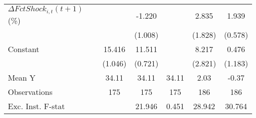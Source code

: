 {\begin{tabular}{l*{5}{c}}
\addlinespace
$ \Delta FctShock_{i,t}(t+1)$ (\%)&                     &      -1.220         &                     &       2.835         &       1.939\sym{***}\\
                    &                     &     (1.008)         &                     &     (1.828)         &     (0.578)         \\
\addlinespace
Constant            &      15.416\sym{***}&      11.511\sym{***}&                     &       8.217\sym{**} &       0.476         \\
                    &     (1.046)         &     (0.721)         &                     &     (2.821)         &     (1.183)         \\
\midrule
Mean Y              &       34.11         &       34.11         &       34.11         &        2.03         &       -0.37         \\
Observations        &         175         &         175         &         175         &         186         &         186         \\
Exc. Inst. F-stat   &                     &      21.946         &       0.451         &      28.942         &      30.764         \\
\bottomrule
\end{tabular}
}
